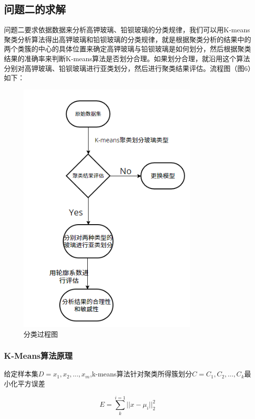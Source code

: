 \documentclass[withoutpreface,bwprint]{cumcmthesis}%
\begin{document}
	\subsection{问题二的求解}
	问题二要求依据数据来分析高钾玻璃、铅钡玻璃的分类规律，我们可以用K-means聚类分析算法得出高钾玻璃和铅钡玻璃的分类规律，就是根据聚类分析的结果中的两个类簇的中心的具体位置来确定高钾玻璃与铅钡玻璃是如何划分，然后根据聚类结果的准确率来判断K-means算法是否划分合理。如果划分合理，就沿用这个算法分别对高钾玻璃、铅钡玻璃进行亚类划分，然后进行聚类结果评估。流程图（图6）如下：
	
	\begin{figure}[!h]
		\centering
		\includegraphics[width=0.8\textwidth]{ph6}
		\caption{分类过程图}
		\label{fig:ph6}
	\end{figure}
	
	\subsubsection{K-Means算法原理}
	给定样本集$D={x_{1},x_{2},...,x_{m}}$,k-means算法针对聚类所得簇划分$C = {C_{1},C_{2},...,C_{k}}$最小化平方误差
	
	\begin{equation}
		E = \sum_{k}^{i=1} ||x - \mu_{i}||_{2}^{2}
	\end{equation}
	
\end{document}

